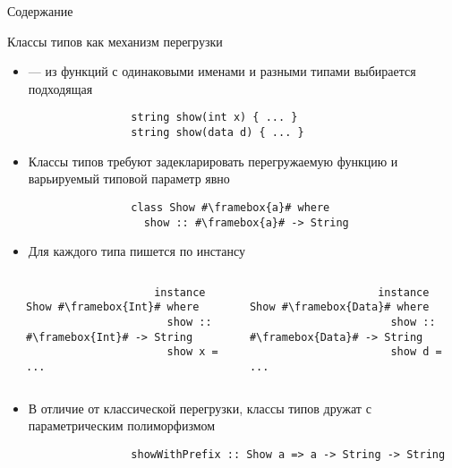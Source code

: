     \begin{frame}[noframenumbering]{Содержание}
        \tableofcontents
    \end{frame}


    \begin{frame}[fragile]{Классы типов как механизм перегрузки}
        \begin{itemize}
            \item {} --- из функций с одинаковыми именами и разными типами выбирается подходящая
            \begin{verbatim}
                string show(int x) { ... }
                string show(data d) { ... }
            \end{verbatim}
            \item \pause Классы типов требуют задекларировать перегружаемую функцию и варьируемый типовой параметр явно
            \begin{verbatim}
                class Show #\framebox{a}# where
                  show :: #\framebox{a}# -> String
            \end{verbatim}
            \item Для каждого типа пишется по инстансу
        \end{itemize}
        \vspace{-1.2em}
        \begin{columns}[onlytextwidth]
            \begin{column}[t]{0.05\textwidth}
            \end{column}\hfill%
            \begin{column}[t]{0.485\textwidth}
                \begin{verbatim}
                    instance Show #\framebox{Int}# where
                      show :: #\framebox{Int}# -> String
                      show x = ...
                \end{verbatim}
            \end{column}\hfill%
            \begin{column}[t]{0.485\textwidth}
                \begin{verbatim}
                    instance Show #\framebox{Data}# where
                      show :: #\framebox{Data}# -> String
                      show d = ...
                \end{verbatim}
            \end{column}
        \end{columns}
        \vspace{0.5em}
        \begin{itemize}
            \item \pause В отличие от классической перегрузки, классы типов дружат с параметрическим полиморфизмом
            \begin{verbatim}
                showWithPrefix :: Show a => a -> String -> String
            \end{verbatim}
        \end{itemize}
    \end{frame}

